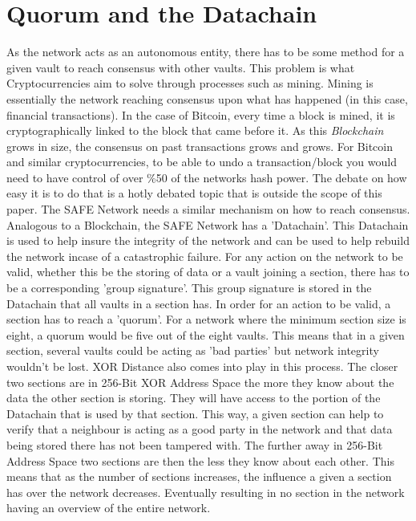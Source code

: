 \section{Quorum and the Datachain}

As the network acts as an autonomous entity, there has to be some method for a given vault to reach consensus with other vaults. This problem is what Cryptocurrencies aim to solve through processes such as mining. Mining is essentially the network reaching consensus upon what has happened (in this case, financial transactions). In the case of Bitcoin, every time a block is mined, it is cryptographically linked to the block that came before it. As this \textit{Blockchain} grows in size, the consensus on past transactions grows and grows. For Bitcoin and similar cryptocurrencies, to be able to undo a transaction/block you would need to have control of over \%50 of the networks hash power. The debate on how easy it is to do that is a hotly debated topic that is outside the scope of this paper. The SAFE Network needs a similar mechanism on how to reach consensus. Analogous to a Blockchain, the SAFE Network has a 'Datachain'. This Datachain is used to help insure the integrity of the network and can be used to help rebuild the network incase of a catastrophic failure. For any action on the network to be valid, whether this be the storing of data or a vault joining a section, there has to be a corresponding 'group signature'. This group signature is stored in the Datachain that all vaults in a section has. In order for an action to be valid, a section has to reach a 'quorum'. For a network where the minimum section size is eight, a quorum would be five out of the eight vaults. This means that in a given section, several vaults could be acting as 'bad parties' but network integrity wouldn't be lost. XOR Distance also comes into play in this process. The closer two sections are in 256-Bit XOR Address Space the more they know about the data the other section is storing. They will have access to the portion of the Datachain that is used by that section. This way, a given section can help to verify that a neighbour is acting as a good party in the network and that data being stored there has not been tampered with. The further away in 256-Bit Address Space two sections are then the less they know about each other. This means that as the number of sections increases, the influence a given a section has over the network decreases. Eventually resulting in no section in the network having an overview of the entire network.

